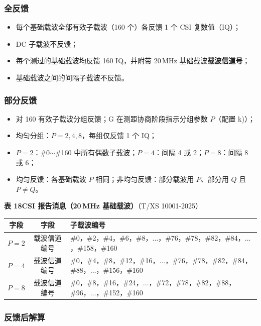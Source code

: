 \documentclass[11pt,a4paper]{ctexart}
\begin{document}
\subsubsection*{全反馈}

\begin{itemize}[nosep]
  \item 每个基础载波全部有效子载波（160 个）各反馈 1 个 CSI 复数值（IQ）；
  \item DC 子载波不反馈；
  \item 每个测过的基础载波均反馈 160 IQ，并附带 20\,MHz 基础载波\textbf{载波信道号}；
  \item 基础载波之间的间隔子载波不反馈。
\end{itemize}

\subsubsection*{部分反馈}

\begin{itemize}[nosep]
  \item 对 160 有效子载波分组反馈；G 在测距协商阶段指示分组参数 $P$（配置 k)）；
  \item 均匀分组：$P=2,4,8$，每组仅反馈 1 个 IQ；
  \item $P=2$：\#0$\sim$\#160 中所有偶数子载波；$P=4$：间隔 4 或 2；$P=8$：间隔 8 或 6；
  \item 均匀反馈：各基础载波 $P$ 相同；非均匀反馈：部分载波用 $P$、部分用 $Q$ 且 $P\neq Q$。
\end{itemize}

\noindent\textbf{表 18\quad CSI 报告消息（20\,MHz 基础载波）}（T/XS 10001-2025）

\begin{center}
\small
\begin{tabular}{|c|c|p{9.2cm}|}
\hline
字段 & 字段 & 子载波编号 \\
\hline
$P=2$ & 载波信道编号 &
\#0，\#2，\#4，\#6，\#8，$\ldots$，\#76，\#78，\#82，\#84，$\ldots$，\#158，\#160 \\
\hline
$P=4$ & 载波信道编号 &
\#0，\#4，\#8，\#12，\#16，$\ldots$，\#76，\#78，\#82，\#84，\#88，$\ldots$，\#156，\#160 \\
\hline
$P=8$ & 载波信道编号 &
\#0，\#8，\#16，\#24，$\ldots$，\#72，\#78，\#82，\#88，\#96，$\ldots$，\#152，\#160 \\
\hline
\end{tabular}
\end{center}

\subsubsection*{反馈后解算}
\end{document}
